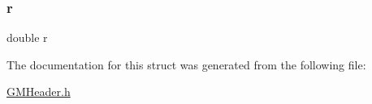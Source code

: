 \mbox{\label{struct_g_mtype___coord_spherical_a880a49112fedae68e714341a9a082fb6}} 
\subsubsection{\texorpdfstring{r}{r}}
{\footnotesize\ttfamily double r}



The documentation for this struct was generated from the following file\+:\begin{DoxyCompactItemize}
\item 
\mbox{\hyperlink{_g_m_header_8h}{G\+M\+Header.\+h}}\end{DoxyCompactItemize}

